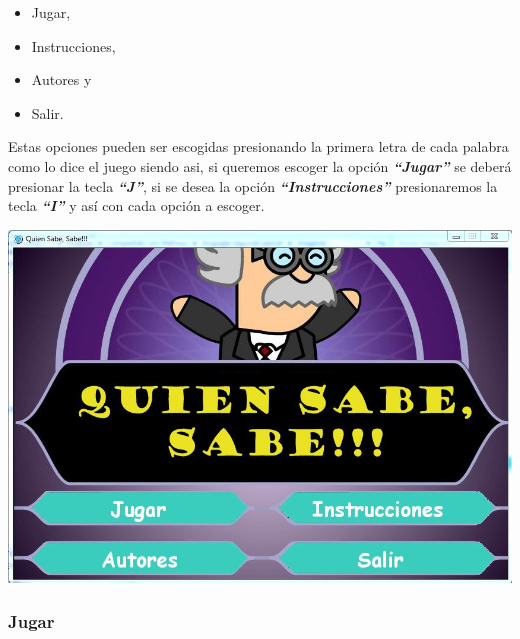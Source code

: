 \documentclass[a4paper,11pt]{article}
\begin{document}
{	\begin{itemize}
		\item Jugar,
		\item Instrucciones,
		\item Autores y 
		\item Salir.
	\end{itemize}
Estas opciones pueden ser escogidas presionando la primera letra de cada palabra como lo dice el juego siendo asi, si queremos escoger la opci\'{o}n \textbf{\textit{``Jugar''}} se deber\'{a} presionar la tecla \textbf{\textit{``J''}}, si se desea la opci\'{o}n \textbf{\textit{``Instrucciones''}} presionaremos la tecla \textbf{\textit{``I''}} y as\'{i} con cada opci\'{o}n a escoger.
\begin{center}
	\includegraphics[scale=0.5]{images/inicio.JPG} 
\end{center}
	
\subsubsection{Jugar}

}
\end{document}
